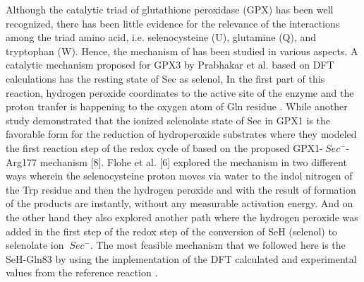 Although the catalytic triad of glutathione peroxidase (GPX) has been well recognized, there has been little evidence for the relevance of the interactions among the triad amino acid, i.e. selenocysteine (U), glutamine (Q), and tryptophan (W). Hence, the mechanism of has been studied in various aspects. A catalytic mechanism proposed for GPX3 by Prabhakar et al. based on DFT calculations has the resting state of Sec as selenol, In the first part of this reaction, hydrogen peroxide coordinates to the active site of the enzyme and the proton tranfer is happening to the oxygen atom of Gln residue \cite{prabhakar_elucidation_2005,prabhakar_is_2006}. While another study demonstrated that the ionized selenolate state of Sec in GPX1 is the favorable form for the reduction of hydroperoxide substrates where they modeled the ﬁrst reaction step of the redox cycle of based on the proposed GPX1-\({\ Sec^-}\)- Arg177 mechanism [8]. Flohe et al. [6]\cite{orian_selenocysteine_2015} explored the mechanism in two different ways wherein the selenocysteine proton moves via water to the indol nitrogen of the Trp residue and then the hydrogen peroxide and with the result of formation of  the products are instantly, without any measurable activation energy. And on the other hand they also explored another path where the hydrogen peroxide was added in the first step of the redox step of the conversion of SeH (selenol) to selenolate ion \({\ Sec^-}\)\cite{flohe_glutathione_2022,orian_selenocysteine_2015}. The most feasible mechanism that we followed here is the SeH-Gln83 by using the implementation of the DFT calculated and experimental values from the reference reaction \cite{prabhakar_is_2006}. 

